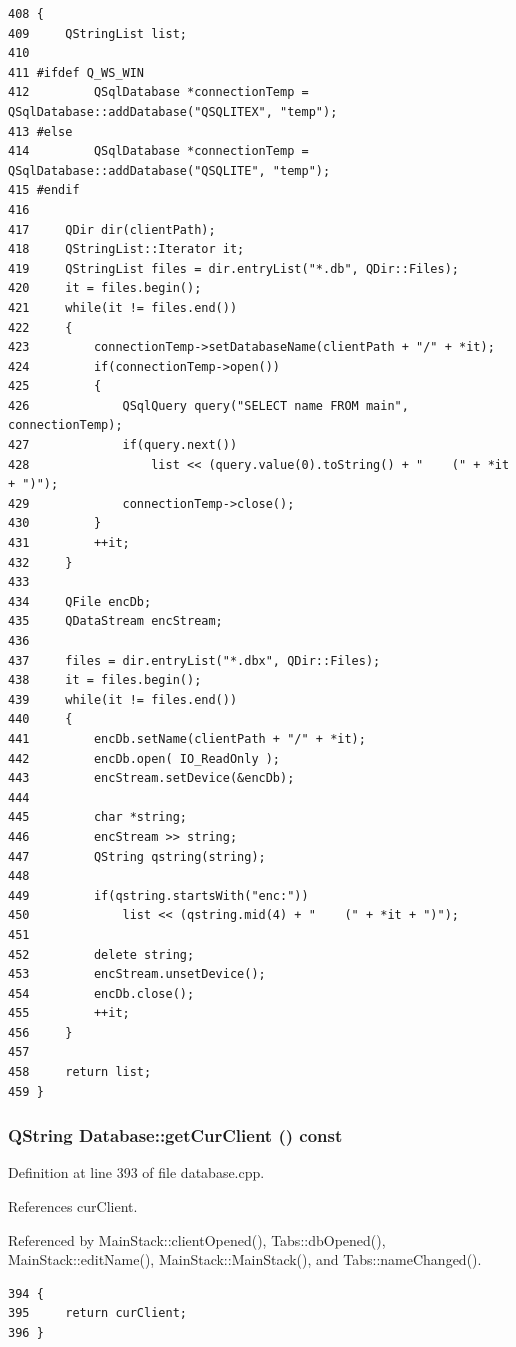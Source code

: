 \footnotesize\begin{verbatim}408 {
409     QStringList list;
410     
411 #ifdef Q_WS_WIN
412         QSqlDatabase *connectionTemp = QSqlDatabase::addDatabase("QSQLITEX", "temp");
413 #else
414         QSqlDatabase *connectionTemp = QSqlDatabase::addDatabase("QSQLITE", "temp");
415 #endif 
416     
417     QDir dir(clientPath);
418     QStringList::Iterator it;
419     QStringList files = dir.entryList("*.db", QDir::Files);
420     it = files.begin();
421     while(it != files.end())
422     {
423         connectionTemp->setDatabaseName(clientPath + "/" + *it);
424         if(connectionTemp->open())
425         {
426             QSqlQuery query("SELECT name FROM main", connectionTemp);
427             if(query.next())
428                 list << (query.value(0).toString() + "    (" + *it + ")");
429             connectionTemp->close();
430         }
431         ++it;
432     }
433 
434     QFile encDb;
435     QDataStream encStream;
436 
437     files = dir.entryList("*.dbx", QDir::Files);
438     it = files.begin();
439     while(it != files.end())
440     {
441         encDb.setName(clientPath + "/" + *it);
442         encDb.open( IO_ReadOnly );
443         encStream.setDevice(&encDb);
444 
445         char *string;
446         encStream >> string;
447         QString qstring(string);
448 
449         if(qstring.startsWith("enc:"))
450             list << (qstring.mid(4) + "    (" + *it + ")");
451 
452         delete string;
453         encStream.unsetDevice();
454         encDb.close();
455         ++it;
456     }
457     
458     return list;
459 }
\end{verbatim}\normalsize 


\hypertarget{classDatabase_a11}{
\subsubsection[getCurClient]{\setlength{\rightskip}{0pt plus 5cm}QString Database::get\-Cur\-Client () const}}
\label{classDatabase_a11}


Definition at line 393 of file database.cpp.

References cur\-Client.

Referenced by Main\-Stack::client\-Opened(), Tabs::db\-Opened(), Main\-Stack::edit\-Name(), Main\-Stack::Main\-Stack(), and Tabs::name\-Changed().

\footnotesize\begin{verbatim}394 {
395     return curClient;
396 }
\end{verbatim}\normalsize 


